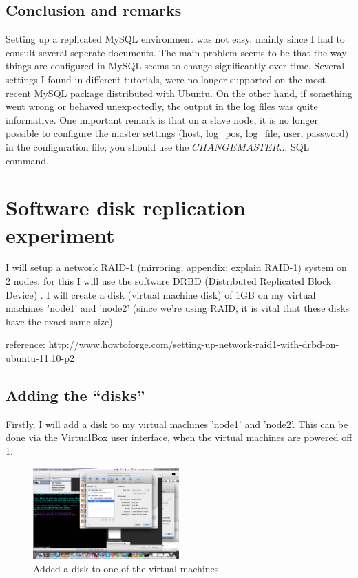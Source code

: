 \documentclass[12pt]{report}
\begin{document}
\subsection{Conclusion and remarks}
Setting up a replicated MySQL environment was not easy, mainly since I
had to consult several seperate documents. The main problem seems to
be that the way things are configured in MySQL seems to change significantly
over time. Several settings I found in different tutorials, were no
longer supported on the most recent MySQL package distributed with
Ubuntu.
On the other hand, if something went wrong or behaved unexpectedly,
the output in the log files was quite informative. 
One important remark is that on a slave node, it is no longer possible
to configure the master settings (host, log\_pos, log\_file, user,
password) in the configuration file; you should use the $CHANGE
MASTER ...$ SQL command.

\section{Software disk replication experiment}
I will setup a network RAID-1 (mirroring; appendix: explain RAID-1)
system on 2 nodes, for this I will use the software DRBD 
(Distributed Replicated Block Device) \cite{drbd_soft:2013}.
I will create a disk (virtual machine disk) of 1GB on my virtual
machines 'node1' and 'node2' (since we're using RAID, it is vital that
these disks have the exact same size).

reference: 
http://www.howtoforge.com/setting-up-network-raid1-with-drbd-on-ubuntu-11.10-p2
\cite{drbd_ubuntu_doc}
\cite{drbd_official_doc}

\subsection{Adding the ``disks''}
Firstly, I will add a disk to my virtual machines 'node1' and
'node2'. This can be done via the VirtualBox user interface, when the
virtual machines are powered off \ref{fig:add_disk_vbox}.

\begin{figure}[h!]
  \caption{Added a disk to one of the virtual machines}
  \label{fig:add_disk_vbox}
  \centering
    \includegraphics[width=0.5\textwidth]{pics/add_disk_vbox.png}
\end{figure}
\end{document}
